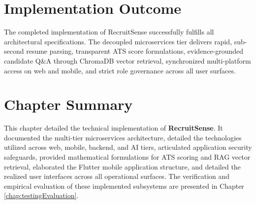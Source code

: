 \section{Implementation Outcome}
The completed implementation of RecruitSense successfully fulfills all architectural specifications. The decoupled microservices tier delivers rapid, sub-second resume parsing, transparent ATS score formulations, evidence-grounded candidate Q\&A through ChromaDB vector retrieval, synchronized multi-platform access on web and mobile, and strict role governance across all user surfaces.

\section{Chapter Summary}
This chapter detailed the technical implementation of \textbf{RecruitSense}. It documented the multi-tier microservices architecture, detailed the technologies utilized across web, mobile, backend, and AI tiers, articulated application security safeguards, provided mathematical formulations for ATS scoring and RAG vector retrieval, elaborated the Flutter mobile application structure, and detailed the realized user interfaces across all operational surfaces. The verification and empirical evaluation of these implemented subsystems are presented in Chapter \ref{chap:testingEvaluation}.
